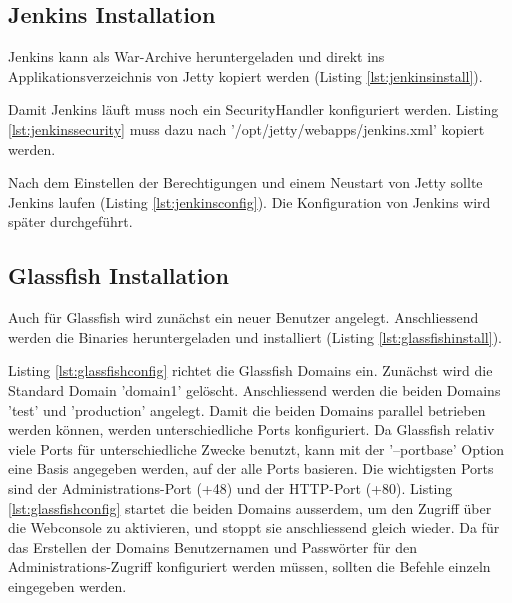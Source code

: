 

\subsection{Jenkins Installation}

Jenkins kann als War-Archive heruntergeladen und direkt ins Applikationsverzeichnis von Jetty kopiert werden (Listing \ref{lst:jenkinsinstall}).



Damit Jenkins läuft muss noch ein SecurityHandler konfiguriert werden. Listing \ref{lst:jenkinssecurity} muss dazu nach '/opt/jetty/webapps/jenkins.xml' kopiert werden.



Nach dem Einstellen der Berechtigungen und einem Neustart von Jetty sollte Jenkins laufen (Listing \ref{lst:jenkinsconfig}). Die Konfiguration von Jenkins wird später durchgeführt.



\subsection{Glassfish Installation}

Auch für Glassfish wird zunächst ein neuer Benutzer angelegt. Anschliessend werden die Binaries heruntergeladen und installiert (Listing \ref{lst:glassfishinstall}).



Listing \ref{lst:glassfishconfig} richtet die Glassfish Domains ein. Zunächst wird die Standard Domain 'domain1' gelöscht. Anschliessend werden die beiden Domains 'test' und 'production' angelegt. Damit die beiden Domains parallel betrieben werden können, werden unterschiedliche Ports konfiguriert. Da Glassfish relativ viele Ports für unterschiedliche Zwecke benutzt, kann mit der '--portbase' Option eine Basis angegeben werden, auf der alle Ports basieren. Die wichtigsten Ports sind der Administrations-Port (+48) und der HTTP-Port (+80). Listing \ref{lst:glassfishconfig} startet die beiden Domains ausserdem, um den Zugriff über die Webconsole zu aktivieren, und stoppt sie anschliessend gleich wieder. Da für das Erstellen der Domains Benutzernamen und Passwörter für den Administrations-Zugriff konfiguriert werden müssen, sollten die Befehle einzeln eingegeben werden.

